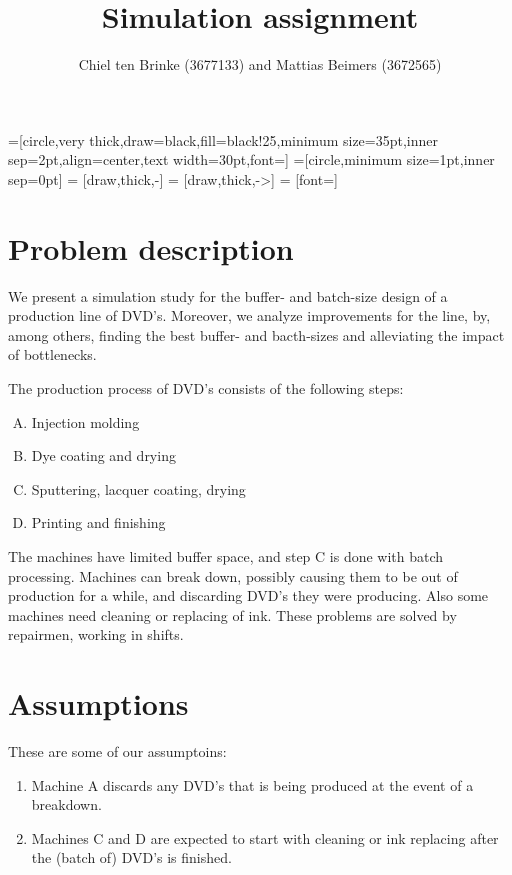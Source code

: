 \documentclass{article}
\title{Simulation assignment}
\author{Chiel ten Brinke (3677133) and Mattias Beimers (3672565)}
\date{\vspace{-3ex}}
\begin{document}
    =[circle,very thick,draw=black,fill=black!25,minimum size=35pt,inner sep=2pt,align=center,text width=30pt,font=\tiny]
    =[circle,minimum size=1pt,inner sep=0pt]
     = [draw,thick,-]
     = [draw,thick,->]
     = [font=\small]

    \maketitle

    
    \section{Problem description}
        We present a simulation study for the buffer- and batch-size design of a production line of DVD's.
        Moreover, we analyze improvements for the line, by, among others, finding the best buffer- and bacth-sizes and alleviating the impact of bottlenecks.

        The production process of DVD's consists of the following steps:
        \begin{enumerate}[A.]
            \item Injection molding
            \item Dye coating and drying
            \item Sputtering, lacquer coating, drying
            \item Printing and finishing 
        \end{enumerate}
        The machines have limited buffer space, and step C is done with batch processing.
        Machines can break down, possibly causing them to be out of production for a while,
        and discarding DVD's they were producing. Also some machines need cleaning or replacing of ink.
        These problems are solved by repairmen, working in shifts.

    \section{Assumptions}
        These are some of our assumptoins:
        \begin{enumerate}
            \item 
                Machine A discards any DVD's that is being produced at the event of a breakdown.
            \item 
                Machines C and D are expected to start with cleaning or ink replacing after the (batch of) DVD's is finished.
        \end{enumerate}
\end{document}
